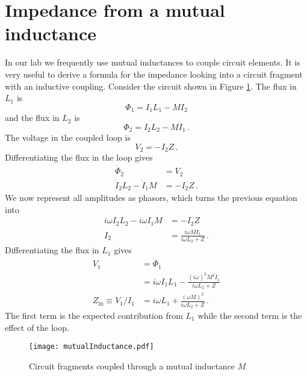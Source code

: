 \section{Impedance from a mutual inductance}

In our lab we frequently use mutual inductances to couple circuit elements.
It is very useful to derive a formula for the impedance looking into a circuit fragment with an inductive coupling.
Consider the circuit shown in Figure \ref{Fig:mutualInductance}.
The flux in $L_1$ is
\begin{equation}
\Phi_1 = I_1 L_1 - M I_2
\end{equation}
and the flux in $L_2$ is
\begin{equation}
\Phi_2 = I_2 L_2 - M I_1 \, .
\end{equation}
The voltage in the coupled loop is
\begin{equation}
V_2 = - I_2 Z \, .
\end{equation}
Differentiating the flux in the loop gives
\begin{align}
\dot{\Phi}_2 &= V_2 \\
\dot{I}_2 L_2 - \dot{I}_1 M &= - I_2 Z \,.
\end{align}
We now represent all amplitudes as phasors, which turns the previous equation into
\begin{align}
i \omega I_2 L_2 - i \omega I_1 M &= - I_2 Z \\
I_2 &= \frac{i \omega M I_1}{i\omega L_2 + Z} \, .
\end{align}
Differentiating the flux in $L_1$ gives
\begin{align}
V_1 &= \dot{\Phi}_1 \\
&= i \omega I_1 L_1 - \frac{(i \omega)^2 M^2 I_1}{i \omega L_2 + Z} \\
Z_{\text{in}} \equiv V_1/I_1 &= i \omega L_1 + \frac{(\omega M)^2}{i \omega L_2 + Z} \, .
\end{align}
The first term is the expected contribution from $L_{1}$ while the second term is the effect of the loop.

\begin{figure}
\begin{centering}
\texttt{[image: mutualInductance.pdf]} 
\par\end{centering}
\caption{Circuit fragments coupled through a mutual inductance $M$}
\label{Fig:mutualInductance}
\end{figure}
